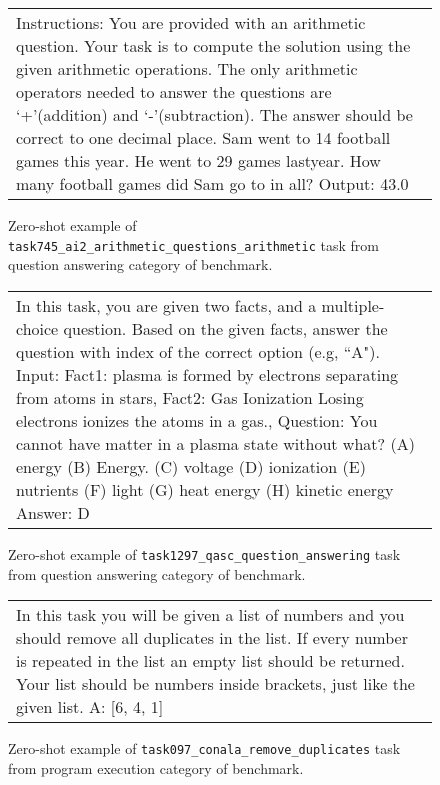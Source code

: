 

\begin{figure}[h]
\centering
\begin{tabular}{p{}}
\cellcolor{oldlace} Instructions: You are provided with an arithmetic question. Your task is to compute the solution using the given arithmetic operations. The only arithmetic operators needed to answer the questions are `+'(addition) and `-'(subtraction). The answer should be correct to one decimal place.\vspace{1pt} \newline Sam went to 14 football games this year. He went to 29 games lastyear. How many football games did Sam go to in all? Output: \textcolor{cadmiumgreen}{43.0} \\
\end{tabular}
\caption{Zero-shot example of \texttt{task745\_ai2\_arithmetic\_questions\_arithmetic} task from question answering category of \natins benchmark.}
\end{figure}




\begin{figure}[h]
\centering
\begin{tabular}{p{}}
\cellcolor{oldlace} In this task, you are given two facts, and a multiple-choice question. Based on the given facts, answer the question with index of the correct option (e.g, ``A").\vspace{1pt} \newline Input: Fact1: plasma is formed by electrons separating from atoms in stars, Fact2: Gas Ionization Losing electrons ionizes the atoms in a gas., Question: You cannot have matter in a plasma state without what? (A) energy (B) Energy. (C) voltage (D) ionization (E) nutrients (F) light (G) heat energy (H) kinetic energy\vspace{1pt} \newline Answer: \textcolor{cadmiumgreen}{D} \\
\end{tabular}
\caption{Zero-shot example of \texttt{task1297\_qasc\_question\_answering} task from question answering category of \natins benchmark.}
\end{figure}




\begin{figure}[h]
\centering
\begin{tabular}{p{}}
\cellcolor{oldlace} In this task you will be given a list of numbers and you should remove all duplicates in the list. If every number is repeated in the list an empty list should be returned. Your list should be numbers inside brackets, just like the given list.\vspace{1pt} \newline [0, 0, 3, 6, 5, 3, 0, 4, 1, 5] A: \textcolor{cadmiumgreen}{[6, 4, 1]} \\
\end{tabular}
\caption{Zero-shot example of \texttt{task097\_conala\_remove\_duplicates} task from program execution category of \natins benchmark.}
\end{figure}




